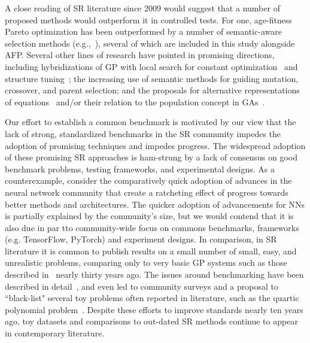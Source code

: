 A close reading of SR literature since 2009 would suggest that a number of proposed methods would outperform it in controlled tests.
For one, age-fitness Pareto optimization has been outperformed by a number of semantic-aware selection methods (e.g.,~\cite{lacavaEpsilonLexicaseSelectionRegression2016c,liskowskiDiscoverySearchObjectives2017}), several of which are included in this study alongside AFP.
Several other lines of research have pointed in promising directions, including hybridizations of GP with local search for constant optimization~\cite{topchyFasterGeneticProgramming2001,kommendaParameterIdentificationSymbolic2019} and structure tuning~\cite{lacavaInferenceCompactNonlinear2016}; the increasing use of semantic methods for guiding mutation, crossover, and parent selection; and the proposals for alternative representations of equations~\cite{defrancaInteractionTransformationEvolutionaryAlgorithm2020} and/or their relation to the population concept in GAs~\cite{mcconaghyFFXFastScalable2011}.

Our effort to establish a common benchmark is motivated by our view that the lack of strong, standardized benchmarks in the SR community impedes the adoption of promising techniques and impedes progress.  
The widespread adoption of these promising SR approaches is ham-strung by a lack of consensus on good benchmark problems, testing frameworks, and experimental designs. 
As a counterexample, consider the comparatively quick adoption of advances in the neural network community that create a ratcheting effect of progress towards better methods and architectures. 
The quicker adoption of advancements for NNs is partially explained by the community's size, but we would contend that it is also due in par tto community-wide focus on commons benchmarks, frameworks (e.g. TensorFlow, PyTorch) and experiment designs. 
In comparison, in SR literature it is common to publish results on a small number of small, easy, and unrealistic problems, comparing only to very basic GP systems such as those described in~\cite{kozaGeneticProgrammingProgramming1992a} nearly thirty years ago.   
The issues around benchmarking have been described in detail~\cite{mcdermottGeneticProgrammingNeeds2012b}, and even led to community surveys and a proposal to ``black-list" several toy problems often reported in literature, such as the quartic polynomial problem~\cite{whiteBetterGPBenchmarks2012a}.
Despite these efforts to improve standards nearly ten years ago, toy datasets and comparisons to out-dated SR methods continue to appear in contemporary literature.

